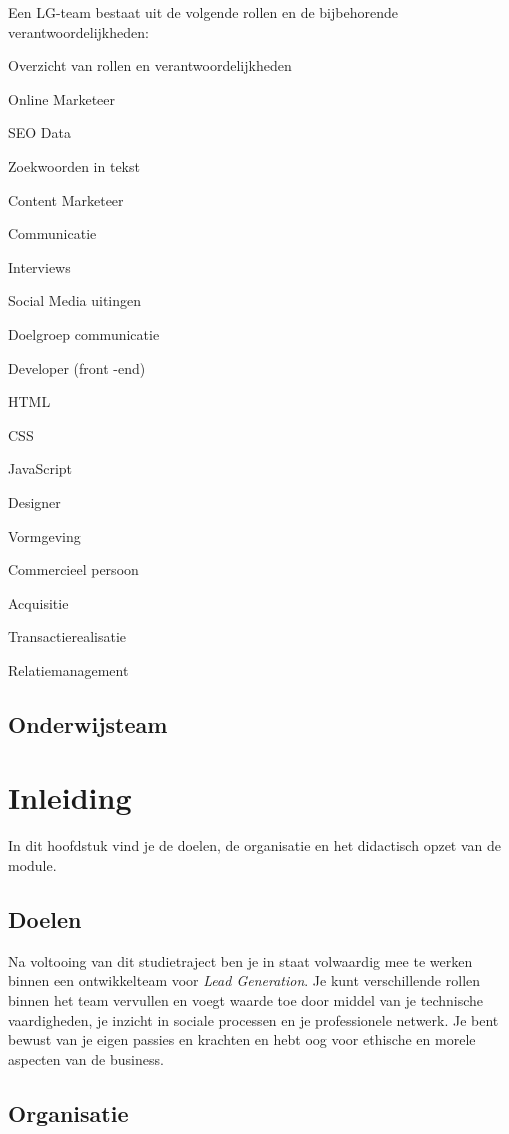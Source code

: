 \documentclass[]{book}
\begin{document}
Een LG-team bestaat uit de volgende rollen en de bijbehorende
verantwoordelijkheden:

\label{tab:unnamed-chunk-2}Overzicht van rollen en verantwoordelijkheden

Online Marketeer

SEO Data

Zoekwoorden in tekst

Content Marketeer

Communicatie

Interviews

Social Media uitingen

Doelgroep communicatie

Developer (front -end)

HTML

CSS

JavaScript

Designer

Vormgeving

Commercieel persoon

Acquisitie

Transactierealisatie

Relatiemanagement

\section{Onderwijsteam}\label{onderwijsteam}

\chapter{Inleiding}\label{inleiding}

In dit hoofdstuk vind je de doelen, de organisatie en het didactisch
opzet van de module.

\section{Doelen}\label{doelen}

Na voltooing van dit studietraject ben je in staat volwaardig mee te
werken binnen een ontwikkelteam voor \emph{Lead Generation}. Je kunt
verschillende rollen binnen het team vervullen en voegt waarde toe door
middel van je technische vaardigheden, je inzicht in sociale processen
en je professionele netwerk. Je bent bewust van je eigen passies en
krachten en hebt oog voor ethische en morele aspecten van de business.

\section{Organisatie}\label{organisatie}
\end{document}
